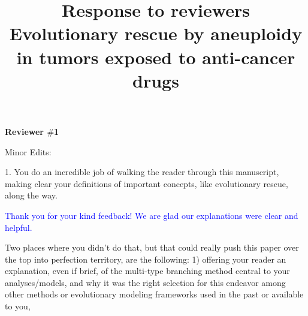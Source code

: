 \documentclass[12pt]{extarticle}
\title{
	Response to reviewers\\ Evolutionary rescue by aneuploidy in tumors exposed to anti-cancer drugs 
}
\begin{document}
\maketitle

\textbf{Reviewer $\#$1}




Minor Edits:

1. You do an incredible job of walking the reader through this manuscript, making clear your definitions of important concepts, like evolutionary rescue, along the way. 

\textcolor{blue}{Thank you for your kind feedback! We are glad our explanations were clear and helpful.}

Two places where you didn't do that, but that could really push this paper over the top into perfection territory, are the following: 1) offering your reader an explanation, even if brief, of the multi-type branching method central to your analyses/models, and why it was the right selection for this endeavor among other methods or evolutionary modeling frameworks used in the past or available to you,
\end{document}
